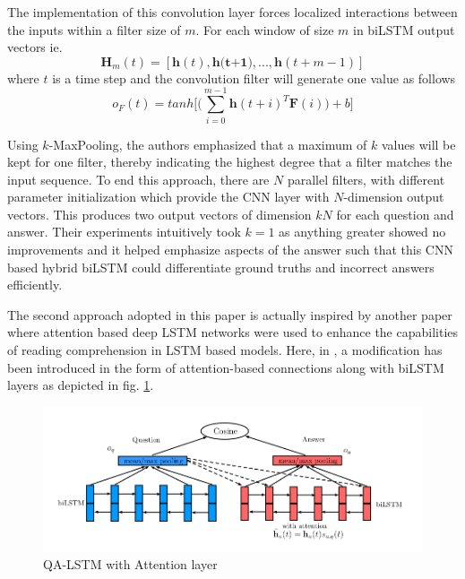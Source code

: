 \documentclass[a4paper,12pt]{report}
\begin{document}
            The implementation of this convolution layer forces localized interactions between the inputs within a filter size of $ m $. For each window of size $ m $ in biLSTM output vectors ie.
            \begin{equation}
            \textbf{H}_{m}(t)=[\textbf{h}(t), \textbf{h(t+1)},...,\textbf{h}(t+m-1)]
            \end{equation}
            where $ t $ is a time step and the convolution filter will generate one value as follows
            \begin{equation}
                o_{F}(t) = tanh \bigg[\bigg(\sum_{i=0}^{m-1}\textbf{h}(t+i)^{T}\textbf{F}(i)\bigg)+b\bigg]
            \end{equation}

            Using $ k $-MaxPooling, the authors emphasized that a maximum of $ k $ values will be kept  for one filter, thereby indicating the highest degree that a filter matches the input sequence. To end this approach, there are $ N $ parallel filters, with different parameter initialization which provide the CNN layer with $ N $-dimension output vectors. This produces two output vectors of dimension $ kN $ for each question and answer.  Their experiments intuitively took $k=1$ as anything greater showed no improvements and it helped emphasize aspects of the answer such that this CNN based hybrid biLSTM could differentiate ground truths and incorrect answers efficiently.

            The second approach adopted in this paper is actually inspired by another paper \citep{bilstmHerman} where attention based deep LSTM networks were used to enhance the capabilities of reading comprehension in LSTM based models. Here, in \citep{lstmhaighextractive}, a modification has been introduced in the form of attention-based connections along with biLSTM layers as depicted in fig. \ref{lstmhaigattention}.
            \begin{figure}
                \centering
                \includegraphics[scale=0.35]{../images/lstm-bilstmhaighattention.png}
                \caption{QA-LSTM with Attention layer \citep{lstmhaighextractive}}\label{lstmhaigattention}
            \end{figure}
\end{document}
